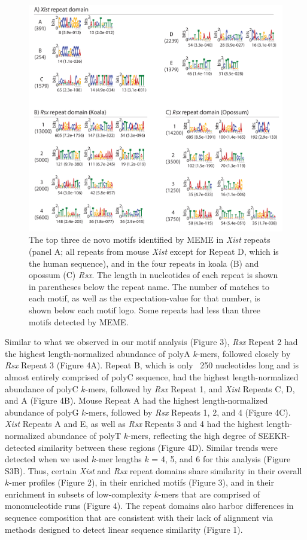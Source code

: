 \begin{figure}[p]
\centering
\includegraphics[angle=0, width=\textwidth]{images/fig3_v3-01.pdf}
\caption[Motif analysis of \emph{\emph{Xist}} and \emph{\emph{Rsx}}]{The top three de novo motifs identified by MEME in \emph{Xist} repeats (panel A; all repeats from mouse \emph{Xist} except for Repeat D, which is the human sequence), and in the four repeats in koala (B) and opossum (C) \emph{Rsx}. The length in nucleotides of each repeat is shown in parentheses below the repeat name. The number of matches to each motif, as well as the expectation-value for that number, is shown below each motif logo. Some repeats had less than three motifs detected by MEME.}
\end{figure}
Similar to what we observed in our motif analysis (Figure 3), \emph{Rsx} Repeat 2 had the highest length-normalized abundance of polyA $k$-mers, followed closely by \emph{Rsx} Repeat 3 (Figure 4A). Repeat B, which is only ~250 nucleotides long and is almost entirely comprised of polyC sequence, had the highest length-normalized abundance of polyC $k$-mers, followed by \emph{Rsx} Repeat 1, and \emph{Xist} Repeats C, D, and A (Figure 4B). Mouse Repeat A had the highest length-normalized abundance of polyG $k$-mers, followed by \emph{Rsx} Repeats 1, 2, and 4 (Figure 4C). \emph{Xist} Repeats A and E, as well as \emph{Rsx} Repeats 3 and 4 had the highest length-normalized abundance of polyT $k$-mers, reflecting the high degree of SEEKR-detected similarity between these regions (Figure 4D). Similar trends were detected when we used $k$-mer lengths $k$ = 4, 5, and 6 for this analysis (Figure S3B). Thus, certain \emph{Xist} and \emph{Rsx} repeat domains share similarity in their overall $k$-mer profiles (Figure 2), in their enriched motifs (Figure 3), and in their enrichment in subsets of low-complexity $k$-mers that are comprised of mononucleotide runs (Figure 4). The repeat domains also harbor differences in sequence composition that are consistent with their lack of alignment via methods designed to detect linear sequence similarity (Figure 1).


